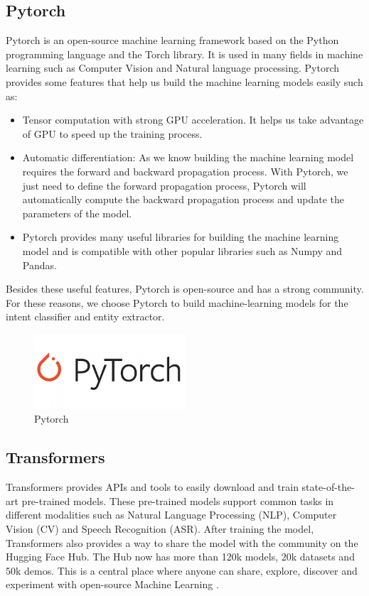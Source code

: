 \subsection{Pytorch}
Pytorch is an open-source machine learning framework based on the Python programming language and the Torch library. It is used in many fields in machine learning such as Computer Vision and Natural language processing.  Pytorch provides some features that help us build the machine learning models easily such as:
\begin{itemize}
    \item Tensor computation with strong GPU acceleration. It helps us take advantage of GPU to speed up the training process.
    \item Automatic differentiation: As we know building the machine learning model requires the forward and backward propagation process. With Pytorch, we just need to define the forward propagation process, Pytorch will automatically compute the backward propagation process and update the parameters of the model.
    \item Pytorch provides many useful libraries for building the machine learning model and is compatible with other popular libraries such as Numpy and Pandas.
\end{itemize}

\noindent Besides these useful features, Pytorch is open-source and has a strong community. For these reasons, we choose Pytorch to build machine-learning models for the intent classifier and entity extractor.

\begin{figure}[ht]
    \centering
    \includegraphics[width=0.5\textwidth]{../Images/8.Technology_Stack/pytorch_logo.png}
    \caption{Pytorch}
    \label{fig:pytorch}
\end{figure}

\subsection{Transformers}
Transformers provides APIs and tools to easily download and train state-of-the-art pre-trained models. These pre-trained models support common tasks in different modalities such as Natural Language Processing (NLP), Computer Vision (CV) and Speech Recognition (ASR). After training the model, Transformers also provides a way to share the model with the community on the Hugging Face Hub. The Hub now has more than 120k models, 20k datasets and 50k demos. This is a central place where anyone can share, explore, discover and experiment with open-source Machine Learning \cite{huggingface}.

